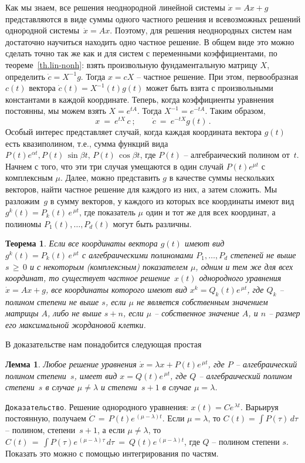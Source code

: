 \documentclass[12pt,a4paper]{article}
\newtheorem{theorem}{Теорема}
\newtheorem{lemma}{Лемма}
\begin{document}
Как мы знаем, все решения  неоднородной линейной системы $\dot x = Ax + g$ представляются в виде суммы
одного частного решения и всевозможных решений однородной системы~$\dot x = Ax$. Поэтому, для решения неоднородных систем нам достаточно научиться находить одно частное решение. В общем виде это можно сделать точно так же как и для систем с переменными коэффициентами, по теореме~\ref{th.lin-nonh}: взять произвольную фундаментальную матрицу $X$,
определить $\dot c = X^{-1} g$. Тогда $x = cX$ -- частное решение. При этом, первообразная $c(t)$ вектора
$\dot c(t) = X^{-1}(t)g(t)$ может быть взята с произвольными константами в каждой координате.
Теперь, когда коэффициенты уравнения постоянны, мы можем взять $X = e^{tA}$. Тогда $X^{-1} = e^{-tA}$.
Таким образом,
\begin{equation}\label{eq.lin-nonh-c}
x \ = \  e^{tX}\, c\ ; \qquad \dot c \ = \  e^{-t X}g(t)\, .
\end{equation}
Особый интерес представляет случай, когда каждая координата вектора $g(t)$ есть квазиполином,
т.е., сумма функций вида $P(t)e^{\alpha t}, P(t) \, \sin \beta t, \, P(t)\, \cos \beta t$,
где $P(t)$ -- алгебраический полином от~$t$. Начнем с того, что эти три случая умещаются в один случай $P(t)e^{\mu t}$ с комплексным $\mu$. Далее, можно представить $g$ в качестве суммы нескольких векторов, найти частное решение для
каждого из них, а затем сложить. Мы разложим~$g$ в сумму векторов, у каждого из которых все координаты имеют вид $g^k(t) = P_k(t)\, e^{\, \mu t}$,
где показатель $\mu$ один и тот же для всех координат, а полиномы $P_1(t), \ldots , P_d(t)$ могут быть различны.
\begin{theorem}\label{th.lin-nonh-c}
Если все координаты вектора $g(t)$
 имеют вид $g^k(t) = P_k(t)\, e^{\, \mu t}$ с алгебраическими полиномами
 $P_1, \ldots , P_d$ степеней  не выше $s\, \ge \, 0$ и с некоторым (комплексным) показателем $\mu$, одним и тем же для всех координат, то существует частное решение~$x(t)$ однородного уравнения $\dot x = Ax + g$, все координаты которого
 имеют вид $x^k = Q_k(t)e^{\, \mu t}$, где $Q_k$ -- полином степени не выше $s$, если $\mu$ не является собственным значением матрицы $A$, либо не выше $s+n$, если $\mu$ -- собственное значение $A$, и $n$ -- размер его максимальной
 жордановой клетки.
 \end{theorem}
 В доказательстве нам понадобится следующая простая
 \begin{lemma}\label{l.lin-nonh}
Любое решение уравнения  $\dot x = \lambda x  + P(t) e^{\, \mu t}$, где $P$ -- алгебраический полином степени~$s$,
имеет вид $x = Q(t) e^{\, \mu t}$, где $Q$ -- алгебраический полином степени~$s$ в случае $\mu \ne \lambda$
и  степени~$s+1$ в случае $\mu = \lambda$.
 \end{lemma}
 {\tt Доказательство}. Решение однородного уравнения: $x(t) = C e^{\, \lambda t}$.
 Варьируя постоянную, получаем $\dot C \, = \, P(t) e^{\, (\mu - \lambda )t}$.
 Если $\mu = \lambda$, то $C(t) = \int P (\tau) \, d \tau$ -- полином, степени~$s+1$, а если
 $\mu \ne \lambda$, то $C(t) \, = \, \int P (\tau) e^{\, (\mu - \lambda )\tau} \, d \tau \ = \
  Q(t)e^{\, (\mu - \lambda )t}$, где $Q$ -- полином степени $s$. Показать это можно с помощью интегрирования по частям.
\end{document}
